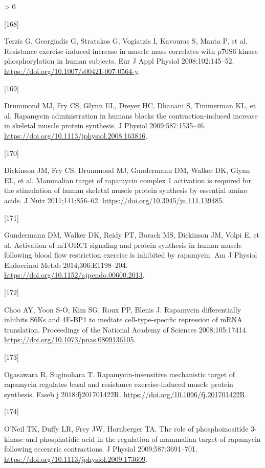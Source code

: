 \documentclass[twoside,10pt]{gihclass} %
\newlength{\cslhangindent}
\newlength{\csllabelwidth}
\newenvironment{CSLReferences}[3] %
 {%
  \setlength{\parindent}{0pt}
  \ifodd #1 \everypar{\setlength{\hangindent}{\cslhangindent}}\ignorespaces\fi
  \ifnum #2 > 0
  \setlength{\parskip}{#2\baselineskip}
  \fi
 }%
 {}
\newcommand{\CSLLeftMargin}[1]{\parbox[t]{\maxof{\widthof{#1}}{\csllabelwidth}}{#1}}
\newcommand{\CSLRightInline}[1]{\parbox[t]{\linewidth}{#1}}
\begin{document}
\begin{CSLReferences}{0}{0}
\leavevmode\hypertarget{ref-RN785}{}%
\CSLLeftMargin{{[}168{]} }
\CSLRightInline{Terzis G, Georgiadis G, Stratakos G, Vogiatzis I, Kavouras S, Manta P, et al. Resistance exercise-induced increase in muscle mass correlates with p70S6 kinase phosphorylation in human subjects. Eur J Appl Physiol 2008;102:145--52. \url{https://doi.org/10.1007/s00421-007-0564-y}.}

\leavevmode\hypertarget{ref-RN780}{}%
\CSLLeftMargin{{[}169{]} }
\CSLRightInline{Drummond MJ, Fry CS, Glynn EL, Dreyer HC, Dhanani S, Timmerman KL, et al. Rapamycin administration in humans blocks the contraction-induced increase in skeletal muscle protein synthesis. J Physiol 2009;587:1535--46. \url{https://doi.org/10.1113/jphysiol.2008.163816}.}

\leavevmode\hypertarget{ref-RN781}{}%
\CSLLeftMargin{{[}170{]} }
\CSLRightInline{Dickinson JM, Fry CS, Drummond MJ, Gundermann DM, Walker DK, Glynn EL, et al. Mammalian target of rapamycin complex 1 activation is required for the stimulation of human skeletal muscle protein synthesis by essential amino acids. J Nutr 2011;141:856--62. \url{https://doi.org/10.3945/jn.111.139485}.}

\leavevmode\hypertarget{ref-RN2826}{}%
\CSLLeftMargin{{[}171{]} }
\CSLRightInline{Gundermann DM, Walker DK, Reidy PT, Borack MS, Dickinson JM, Volpi E, et al. Activation of mTORC1 signaling and protein synthesis in human muscle following blood flow restriction exercise is inhibited by rapamycin. Am J Physiol Endocrinol Metab 2014;306:E1198--204. \url{https://doi.org/10.1152/ajpendo.00600.2013}.}

\leavevmode\hypertarget{ref-RN2839}{}%
\CSLLeftMargin{{[}172{]} }
\CSLRightInline{Choo AY, Yoon S-O, Kim SG, Roux PP, Blenis J. Rapamycin differentially inhibits S6Ks and 4E-BP1 to mediate cell-type-specific repression of mRNA translation. Proceedings of the National Academy of Sciences 2008;105:17414. \url{https://doi.org/10.1073/pnas.0809136105}.}

\leavevmode\hypertarget{ref-RN2836}{}%
\CSLLeftMargin{{[}173{]} }
\CSLRightInline{Ogasawara R, Suginohara T. Rapamycin-insensitive mechanistic target of rapamycin regulates basal and resistance exercise-induced muscle protein synthesis. Faseb j 2018:fj201701422R. \url{https://doi.org/10.1096/fj.201701422R}.}

\leavevmode\hypertarget{ref-RN2844}{}%
\CSLLeftMargin{{[}174{]} }
\CSLRightInline{O'Neil TK, Duffy LR, Frey JW, Hornberger TA. The role of phosphoinositide 3-kinase and phosphatidic acid in the regulation of mammalian target of rapamycin following eccentric contractions. J Physiol 2009;587:3691--701. \url{https://doi.org/10.1113/jphysiol.2009.173609}.}


\end{CSLReferences}
\end{document}
